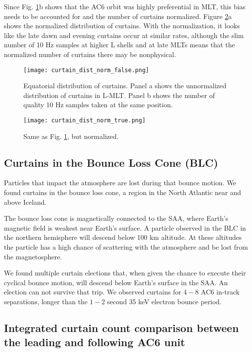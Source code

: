 \documentclass[
10pt, %
a4paper, %
oneside, %
headinclude,footinclude, %
BCOR5mm, %
]{scrartcl}
\begin{document}
Since Fig. \ref{unnormalized_dist}b shows that the AC6 orbit was highly preferential in MLT, this bias needs to be accounted for and the number of curtains normalized. Figure \ref{normalized_dist}a shows the normalized distribution of curtains. With the normalization, it looks like the late dawn and evening curtains occur at similar rates, although the slim number of 10 Hz samples at higher L shells and at late MLTs means that the normalized number of curtains there may be nonphysical.

\begin{figure}
\centering
\texttt{[image: curtain\_dist\_norm\_false.png]}
\caption{Equatorial distribution of curtains. Panel a shows the unnormalized distribution of curtains in L-MLT. Panel b shows the number of quality 10 Hz samples taken at the same position.}
\label{unnormalized_dist}
\end{figure}

\begin{figure}
\centering
\texttt{[image: curtain\_dist\_norm\_true.png]}
\caption{Same as Fig. \ref{unnormalized_dist}, but normalized.}
\label{normalized_dist}
\end{figure}

\subsection{Curtains in the Bounce Loss Cone (BLC)}
Particles that impact the atmosphere are lost during that bounce motion. We found curtains in the bounce loss cone, a region in the North Atlantic near and above Iceland.

The bounce loss cone is magnetically connected to the SAA, where Earth's magnetic field is weakest near Earth's surface. A particle observed in the BLC in the northern hemisphere will descend below 100 km altitude. At these altitudes the particle has a high chance of scattering with the atmosphere and be lost from the magnetosphere. 

We found multiple curtain elections that, when given the chance to execute their cyclical bounce motion, will descend below Earth's surface in the SAA. An election can not survive that trip. We observed curtains for $4-8$ AC6 in-track separations, longer than the $1-2$ second 35 keV electron bounce period.

\subsection{Integrated curtain count comparison between the leading and following AC6 unit}
\end{document}
